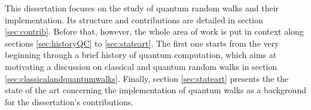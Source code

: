 \documentclass[../../dissertation.tex]{subfiles}
\begin{document}
This dissertation focuses on the study of quantum random walks and their implementation. Its structure and contributions are detailed in section \ref{sec:contrib}. Before that, however, the whole area of work is put in context along sections \ref{sec:historyQC} to \ref{sec:stateart}. The first one starts from the very beginning through a brief history of quantum computation, which aims at motivating a discussion on classical and quantum random walks in section \ref{sec:classicalandquantumwalks}. Finally, section \ref{sec:stateart} presents the the state of the art concerning the implementation of quantum walks as a background for the dissertation’s contributions.
\end{document}
